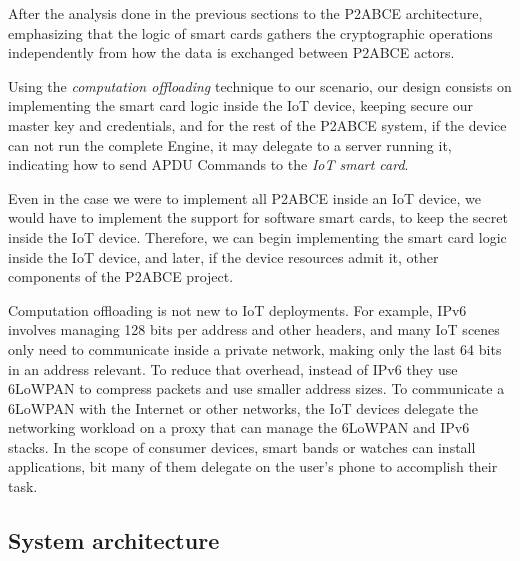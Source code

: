 After the analysis done in the previous sections to the P2ABCE architecture, emphasizing that the logic of smart cards gathers the cryptographic operations independently from how the data is exchanged between P2ABCE actors. 

Using the \textit{computation offloading} technique to our scenario, our design consists on implementing the smart card logic inside the IoT device, keeping secure our master key and credentials, and for the rest of the P2ABCE system, if the device can not run the complete Engine, it may delegate to a server running it, indicating how to send APDU Commands to the \textit{IoT smart card}.

Even in the case we were to implement all P2ABCE inside an IoT device, we would have to implement the support for software smart cards, to keep the secret inside the IoT device. Therefore, we can begin implementing the smart card logic inside the IoT device, and later, if the device resources admit it, other components of the P2ABCE project.


\hfil

Computation offloading is not new to IoT deployments. For example, IPv6 involves managing 128 bits per address and other headers, and many IoT scenes only need to communicate inside a private network, making only the last 64 bits in an address relevant. To reduce that overhead, instead of IPv6 they use 6LoWPAN to compress packets and use smaller address sizes. To communicate a 6LoWPAN with the Internet or other networks, the IoT devices delegate the networking workload on a proxy that can manage the 6LoWPAN and IPv6 stacks. In the scope of consumer devices, smart bands or watches can install applications, bit many of them delegate on the user's phone to accomplish their task.


\subsection{System architecture}



